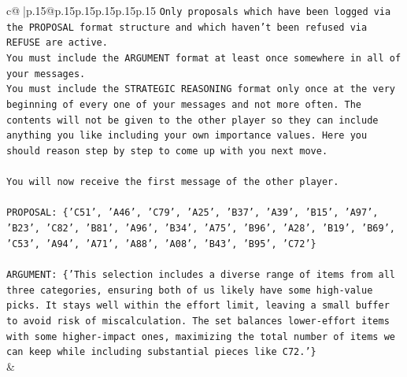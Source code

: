 \documentclass{article}
\begin{document}
{\begin{supertabular}{c@{$\;$}|p{.15\linewidth}@{}p{.15\linewidth}p{.15\linewidth}p{.15\linewidth}p{.15\linewidth}p{.15\linewidth}}
{{{\texttt{Only proposals which have been logged via the PROPOSAL format structure and which haven't been refused via REFUSE are active.} \\
\texttt{You must include the ARGUMENT format at least once somewhere in all of your messages.} \\
\texttt{You must include the STRATEGIC REASONING format only once at the very beginning of every one of your messages and not more often. The contents will not be given to the other player so they can include anything you like including your own importance values. Here you should reason step by step to come up with you next move.} \\
\\ 
\texttt{You will now receive the first message of the other player.} \\
\\ 
\texttt{PROPOSAL: \{'C51', 'A46', 'C79', 'A25', 'B37', 'A39', 'B15', 'A97', 'B23', 'C82', 'B81', 'A96', 'B34', 'A75', 'B96', 'A28', 'B19', 'B69', 'C53', 'A94', 'A71', 'A88', 'A08', 'B43', 'B95', 'C72'\}} \\
\\ 
\texttt{ARGUMENT: \{'This selection includes a diverse range of items from all three categories, ensuring both of us likely have some high{-}value picks. It stays well within the effort limit, leaving a small buffer to avoid risk of miscalculation. The set balances lower{-}effort items with some higher{-}impact ones, maximizing the total number of items we can keep while including substantial pieces like C72.'\}} \\
            }
        }
    }
    & \\ \\


\end{supertabular}}
\end{document}
